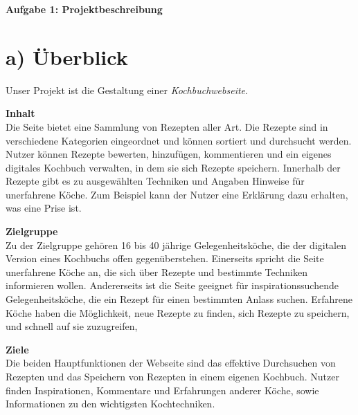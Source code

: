 \documentclass[parskip,10pt,abstracton]{scrartcl}
\renewcommand*{\maketitle}{%
	{\centering\LARGE\sffamily\bfseries Aufgabe 1: Projektbeschreibung \par}
	\vspace{3em}
}
\begin{document}
\maketitle


\section*{a) Überblick}

Unser Projekt ist die Gestaltung einer \textit{Kochbuchwebseite}.

\textbf{Inhalt}\\
Die Seite bietet eine Sammlung von Rezepten aller Art.
Die Rezepte sind in verschiedene Kategorien eingeordnet und können sortiert und durchsucht werden.
Nutzer können Rezepte bewerten, hinzufügen, kommentieren und ein eigenes digitales Kochbuch verwalten, in dem sie sich Rezepte speichern.
Innerhalb der Rezepte gibt es zu ausgewählten Techniken und Angaben Hinweise für unerfahrene Köche. Zum Beispiel kann der Nutzer eine Erklärung dazu erhalten, was eine Prise ist.

\textbf{Zielgruppe}\\
Zu der Zielgruppe gehören 16 bis 40 jährige Gelegenheitsköche, die der digitalen Version eines Kochbuchs offen gegenüberstehen.
Einerseits spricht die Seite unerfahrene Köche an, die sich über Rezepte und bestimmte Techniken informieren wollen. Andererseits ist die Seite geeignet für inspirationssuchende Gelegenheitsköche, die ein Rezept für einen bestimmten Anlass suchen. Erfahrene Köche haben die Möglichkeit, neue Rezepte zu finden, sich Rezepte zu speichern, und schnell auf sie zuzugreifen,

\textbf{Ziele} \\
Die beiden Hauptfunktionen der Webseite sind das effektive Durchsuchen von Rezepten und das Speichern von Rezepten in einem eigenen Kochbuch. Nutzer finden Inspirationen, Kommentare und Erfahrungen anderer Köche, sowie Informationen zu den wichtigsten Kochtechniken.

% 
% 
\end{document}
